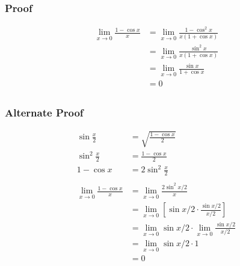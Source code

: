 \documentclass[letterpaper, landscape]{exam}
\begin{document}
  \subsubsection{Proof} %
  
  \begin{align*}
    \lim_{x \to 0} \frac{1 - \cos x}{x} & = \lim_{x \to 0} \frac{1 - \cos^2 x}{x(1 + \cos x)} \\
                                        & = \lim_{x \to 0} \frac{\sin^2 x}{x(1 + \cos x)} \\
                                        & = \lim_{x \to 0} \frac{\sin x}{1 + \cos x} \\
                                        & = 0 \\
  \end{align*}

  \subsubsection{Alternate Proof} %
  
  \begin{align*}
    \sin \frac{x}{2}                    & = \sqrt{\frac{1 - \cos x}{2}} \\
    \sin^2 \frac{x}{2}                  & = \frac{1 - \cos x}{2} \\
    1 - \cos x                          & = 2 \sin^2 \frac{x}{2} \\
    \\
    \lim_{x \to 0} \frac{1 - \cos x}{x} & = \lim_{x \to 0} \frac{2 \sin^2 x/2}{x} \\
                                        & = \lim_{x \to 0} \left[ \sin x/2 \cdot \frac{\sin x/2}{x/2}  \right] \\
                                        & = \lim_{x \to 0} \sin x/2 \cdot \lim_{x \to 0} \frac{\sin x/2}{x/2} \\
                                        & = \lim_{x \to 0} \sin x/2 \cdot 1 \\
                                        & = 0 \\
  \end{align*}

  
\end{document}

